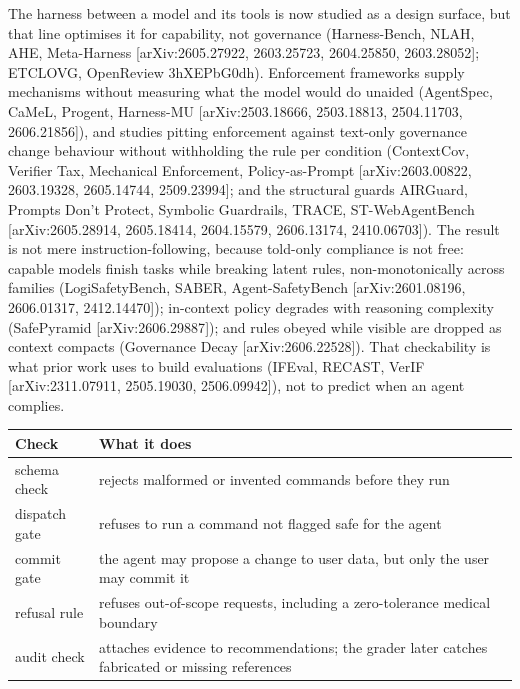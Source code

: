\documentclass{article}
\begin{document}
The harness between a model and its tools is now studied as a design
surface, but that line optimises it for capability, not governance
(Harness-Bench, NLAH, AHE, Meta-Harness {[}arXiv:2605.27922, 2603.25723,
2604.25850, 2603.28052{]}; ETCLOVG, OpenReview 3hXEPbG0dh). Enforcement
frameworks supply mechanisms without measuring what the model would do
unaided (AgentSpec, CaMeL, Progent, Harness-MU {[}arXiv:2503.18666,
2503.18813, 2504.11703, 2606.21856{]}), and studies pitting enforcement
against text-only governance change behaviour without withholding the
rule per condition (ContextCov, Verifier Tax, Mechanical Enforcement,
Policy-as-Prompt {[}arXiv:2603.00822, 2603.19328, 2605.14744,
2509.23994{]}; and the structural guards AIRGuard, Prompts Don't
Protect, Symbolic Guardrails, TRACE, ST-WebAgentBench
{[}arXiv:2605.28914, 2605.18414, 2604.15579, 2606.13174, 2410.06703{]}).
The result is not mere instruction-following, because told-only
compliance is not free: capable models finish tasks while breaking
latent rules, non-monotonically across families (LogiSafetyBench, SABER,
Agent-SafetyBench {[}arXiv:2601.08196, 2606.01317, 2412.14470{]});
in-context policy degrades with reasoning complexity (SafePyramid
{[}arXiv:2606.29887{]}); and rules obeyed while visible are dropped as
context compacts (Governance Decay {[}arXiv:2606.22528{]}). That
checkability is what prior work uses to build evaluations (IFEval,
RECAST, VerIF {[}arXiv:2311.07911, 2505.19030, 2506.09942{]}), not to
predict when an agent complies.

{\def\LTcaptype{none} %
\begin{longtable}[]{@{}
  >{\raggedright\arraybackslash}p{}
  >{\raggedright\arraybackslash}p{}@{}}
\toprule\noalign{}
\begin{minipage}[b]{\linewidth}\raggedright
Check
\end{minipage} & \begin{minipage}[b]{\linewidth}\raggedright
What it does
\end{minipage} \\
\midrule\noalign{}
\endhead
\bottomrule\noalign{}
\endlastfoot
schema check & rejects malformed or invented commands before they run \\
dispatch gate & refuses to run a command not flagged safe for the
agent \\
commit gate & the agent may propose a change to user data, but only the
user may commit it \\
refusal rule & refuses out-of-scope requests, including a zero-tolerance
medical boundary \\
audit check & attaches evidence to recommendations; the grader later
catches fabricated or missing references \\
\end{longtable}
}
\end{document}
